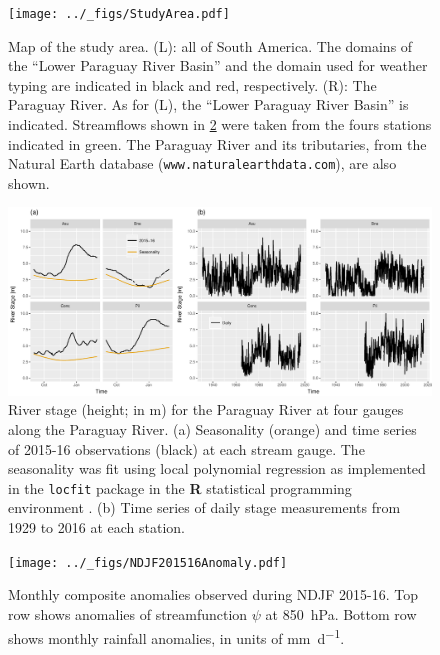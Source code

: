 \documentclass[twocol]{ametsoc}
\begin{document}

\begin{figure}
	\noindent\texttt{[image: ../\_figs/StudyArea.pdf]}
	\caption{
		Map of the study area.
		(L): all of South America.
		The domains of the ``Lower Paraguay River Basin'' and the domain used for weather typing are indicated in black and red, respectively.
		(R): The Paraguay River.
		As for (L), the ``Lower Paraguay River Basin'' is indicated.
		Streamflows shown in \cref{fig:streamflow} were taken from the fours stations indicated in green.
		The Paraguay River and its tributaries, from the Natural Earth database (\texttt{www.naturalearthdata.com}), are also shown.
	}
  \label{fig:study-area}
\end{figure}

\begin{figure}
	\noindent\includegraphics[width=6.5in]{./Streamflow.pdf}
	\caption{
		River stage (height; in \si{\meter}) for the Paraguay River at four gauges along the Paraguay River.
		(a) Seasonality (orange) and time series of 2015-16 observations (black) at each stream gauge.
			The seasonality was fit using local polynomial regression as implemented in the \texttt{locfit} package in
			the \textbf{R} statistical programming environment \citep{Loader1999}.
		(b) Time series of daily stage measurements from 1929 to 2016 at each station.
	}
  \label{fig:streamflow}
\end{figure}

\begin{figure}
	\noindent\texttt{[image: ../\_figs/NDJF201516Anomaly.pdf]}
	\caption{
    	Monthly composite anomalies observed during NDJF 2015-16.
      Top row shows anomalies of streamfunction $\psi$ at \SI{850}{\hecto\pascal}.
      Bottom row shows monthly rainfall anomalies, in units of \si{\milli\meter\per\day}.
	}
  \label{fig:anomalies}
\end{figure}
\end{document}
